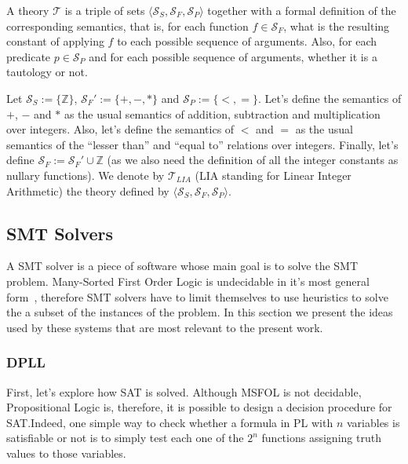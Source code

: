 \begin{definition}[Theory]
  A theory $\mathcal{T}$ is a triple of sets $\langle \mathcal{S}_{S}, \mathcal{S}_{F}, \mathcal{S}_{P}\rangle$ together with a formal definition of the corresponding semantics, that is, for each function $f \in \mathcal{S}_{F}$, what is the resulting constant of applying $f$ to each possible sequence of arguments. Also, for each predicate $p \in \mathcal{S}_{P}$ and for each possible sequence of arguments, whether it is a tautology or not.
\end{definition}

\begin{example}[LIA]
  Let $\mathcal{S}_{S} := \{\mathbb{Z}\}$, $\mathcal{S}_{F}' := \{+, -, *\}$ and $\mathcal{S}_{P} := \{<, =\}$. Let's define the semantics of $+$, $-$ and $*$ as the usual semantics of addition, subtraction and multiplication over integers. Also, let's define the semantics of $<$ and $=$ as the usual semantics of the ``lesser than'' and ``equal to'' relations over integers. Finally, let's define $\mathcal{S}_{F} := \mathcal{S}_{F}' \cup \mathbb{Z}$ (as we also need the definition of all the integer constants as nullary functions). We denote by $\mathcal{T}_{LIA}$ (LIA standing for Linear Integer Arithmetic) the theory defined by $\langle \mathcal{S}_{S}, \mathcal{S}_{F}, \mathcal{S}_{P} \rangle$.
\end{example}

\subsection{SMT Solvers}

A SMT solver is a piece of software whose main goal is to solve the SMT problem. Many-Sorted First Order Logic is undecidable in it's most general form~\cite{fol_undec}, therefore SMT solvers have to limit themselves to use heuristics to solve the a subset of the instances of the problem. In this section we present the ideas used by these systems that are most relevant to the present work.

\subsubsection{DPLL}

First, let’s explore how SAT is solved. Although MSFOL is not decidable, Propositional Logic is, therefore, it is possible to design a decision procedure for SAT.\@ Indeed, one simple way to check whether a formula in PL with $n$ variables is satisfiable or not is to simply test each one of the $2^{n}$ functions assigning truth values to those variables.

